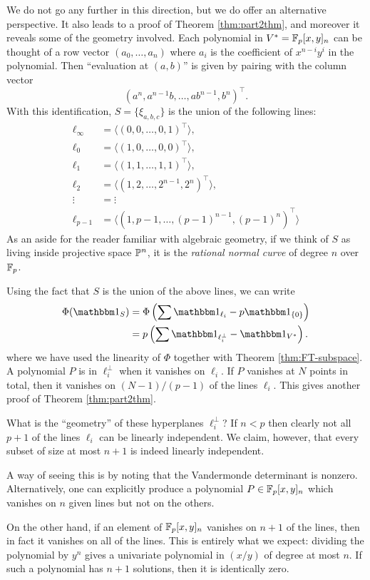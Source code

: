 We do not go any further in this direction, but we do offer an alternative perspective. It also leads to a proof of Theorem \ref{thm:part2thm}, and moreover it reveals some of the geometry involved. Each polynomial in $V^* = \F_p[x,y]_n$ can be thought of a row vector $(a_0,\ldots,a_n)$ where $a_i$ is the coefficient of $x^{n-i}y^i$ in the polynomial. Then ``evaluation at $(a,b)$'' is given by pairing with the column vector
\[
	(a^n,a^{n-1}b,\ldots,ab^{n-1},b^n)^\top.
\]
With this identification, $S = \{\xi_{a,b,c}\}$ is the union of the following lines:
\begin{align*}
	\ell_\infty &= \langle (0,0,\ldots,0,1)^\top \rangle,\\
	\ell_0 &= \langle (1,0,\ldots,0,0)^\top \rangle,\\
	\ell_1 &= \langle (1,1,\ldots,1,1)^\top \rangle,\\
	\ell_2 &= \langle (1,2,\ldots,2^{n-1},2^n)^\top \rangle,\\
	\vdots &= \vdots\\
	\ell_{p-1} &= \langle (1,p-1,\ldots,(p-1)^{n-1},(p-1)^n)^\top \rangle
\end{align*}
As an aside for the reader familiar with algebraic geometry, if we think of $S$ as living inside projective space $\P^{n}$, it is the \emph{rational normal curve} of degree $n$ over $\F_p$.

Using the fact that $S$ is the union of the above lines, we can write
\begin{align*}
	\Phi(\IND_S) &= \Phi\left( \sum \IND_{\ell_i} - p\IND_{\{0\}} \right)\\
	&= p\left(\sum \IND_{\ell_i^\bot} - \IND_{V^*}\right).
\end{align*}
where we have used the linearity of $\Phi$ together with Theorem \ref{thm:FT-subspace}. A polynomial $P$ is in $\ell_i^\bot$ when it vanishes on $\ell_i$. If $P$ vanishes at $N$ points in total, then it vanishes on $(N - 1)/(p-1)$ of the lines $\ell_i$. This gives another proof of Theorem \ref{thm:part2thm}.

What is the ``geometry'' of these hyperplanes $\ell_i^\bot$? If $n < p$ then clearly not all $p+1$ of the lines $\ell_i$ can be linearly independent. We claim, however, that every subset of size at most $n+1$ is indeed linearly independent.

A way of seeing this is by noting that the Vandermonde determinant is nonzero. Alternatively, one can explicitly produce a polynomial $P \in \F_p[x,y]_n$ which vanishes on $n$ given lines but not on the others.

On the other hand, if an element of $\F_p[x,y]_n$ vanishes on $n+1$ of the lines, then in fact it vanishes on all of the lines. This is entirely what we expect: dividing the polynomial by $y^n$ gives a univariate polynomial in $(x/y)$ of degree at most $n$. If such a polynomial has $n+1$ solutions, then it is identically zero.